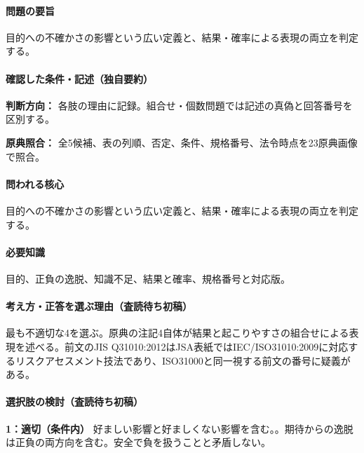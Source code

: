 \paragraph{問題の要旨} 目的への不確かさの影響という広い定義と、結果・確率による表現の両立を判定する。

\paragraph{確認した条件・記述（独自要約）}\mbox{}\par

\noindent\textbf{判断方向：} 各肢の理由に記録。組合せ・個数問題では記述の真偽と回答番号を区別する。\par

\noindent\textbf{原典照合：} 全5候補、表の列順、否定、条件、規格番号、法令時点を23原典画像で照合。\par

\paragraph{問われる核心} 目的への不確かさの影響という広い定義と、結果・確率による表現の両立を判定する。

\paragraph{必要知識} 目的、正負の逸脱、知識不足、結果と確率、規格番号と対応版。

\paragraph{考え方・正答を選ぶ理由（査読待ち初稿）} 最も不適切な4を選ぶ。原典の注記4自体が結果と起こりやすさの組合せによる表現を述べる。前文のJIS Q31010:2012はJSA表紙ではIEC/ISO31010:2009に対応するリスクアセスメント技法であり、ISO31000と同一視する前文の番号に疑義がある。

\paragraph{選択肢の検討（査読待ち初稿）}\mbox{}\par

\noindent\textbf{1：適切（条件内）} 好ましい影響と好ましくない影響を含む。。期待からの逸脱は正負の両方向を含む。安全で負を扱うことと矛盾しない。\par


